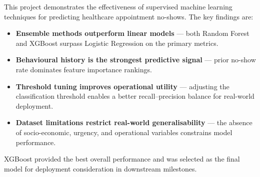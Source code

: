 \documentclass[12pt, a4paper]{report}
\begin{document}
This project demonstrates the effectiveness of supervised machine learning
techniques for predicting healthcare appointment no-shows. The key findings are:

\begin{itemize}
  \item \textbf{Ensemble methods outperform linear models} --- both Random Forest
        and XGBoost surpass Logistic Regression on the primary metrics.
  \item \textbf{Behavioural history is the strongest predictive signal} ---
        prior no-show rate dominates feature importance rankings.
  \item \textbf{Threshold tuning improves operational utility} --- adjusting the
        classification threshold enables a better recall--precision balance for
        real-world deployment.
  \item \textbf{Dataset limitations restrict real-world generalisability} ---
        the absence of socio-economic, urgency, and operational variables
        constrains model performance.
\end{itemize}

\noindent XGBoost provided the best overall performance and was selected as the
final model for deployment consideration in downstream milestones.
\end{document}
